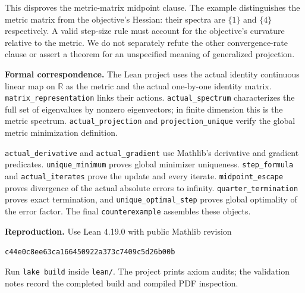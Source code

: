 \documentclass[11pt]{article}
\begin{document}
This disproves the metric-matrix midpoint clause. The example distinguishes
the metric matrix from the objective's Hessian: their spectra are
$\{1\}$ and $\{4\}$ respectively. A valid step-size rule must account for
the objective's curvature relative to the metric. We do not separately
refute the other convergence-rate clause or assert a theorem for an
unspecified meaning of generalized projection.

\textbf{Formal correspondence.}
The Lean project uses the actual identity continuous linear map on
$\mathbb R$ as the metric and the actual one-by-one identity matrix.
\texttt{matrix\_representation} links their actions.
\texttt{actual\_spectrum} characterizes the full set of eigenvalues by
nonzero eigenvectors; in finite dimension this is the metric spectrum.
\texttt{actual\_projection} and \texttt{projection\_unique} verify the
global metric minimization definition.

\texttt{actual\_derivative} and \texttt{actual\_gradient} use Mathlib's
derivative and gradient predicates. \texttt{unique\_minimum} proves
global minimizer uniqueness. \texttt{step\_formula} and
\texttt{actual\_iterates} prove the update and every iterate.
\texttt{midpoint\_escape} proves divergence of the actual absolute
errors to infinity. \texttt{quarter\_termination} proves exact termination,
and \texttt{unique\_optimal\_step} proves global optimality of the
error factor. The final \texttt{counterexample} assembles these objects.

\textbf{Reproduction.}
Use Lean 4.19.0 with public Mathlib revision
\begin{center}\small\texttt{c44e0c8ee63ca166450922a373c7409c5d26b00b}\end{center}
Run \texttt{lake build} inside \texttt{lean/}. The project prints
axiom audits; the validation notes record the completed build and
compiled PDF inspection.
\end{document}
